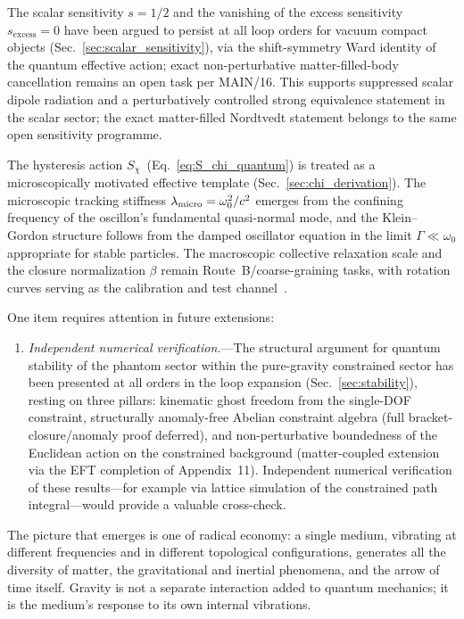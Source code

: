\documentclass[aps,prd,onecolumn,superscriptaddress,nofootinbib,showpacs,12pt,notitlepage]{revtex4-2}
\begin{document}
The scalar sensitivity $s = 1/2$ and the vanishing of the
excess sensitivity $s_{\mathrm{excess}} = 0$ have been
argued to persist at all loop orders for vacuum compact
objects (Sec.~\ref{sec:scalar_sensitivity}), via the
shift-symmetry Ward identity of the quantum effective action;
exact non-perturbative matter-filled-body cancellation remains
an open task per MAIN/16. This supports suppressed scalar
dipole radiation and a perturbatively controlled
strong equivalence statement in the scalar sector; the exact
matter-filled Nordtvedt statement belongs to the same open
sensitivity programme.

The hysteresis action
$S_\chi$~(Eq.~\ref{eq:S_chi_quantum}) is treated as a
microscopically motivated effective template
(Sec.~\ref{sec:chi_derivation}).  The microscopic tracking
stiffness $\lambda_{\rm micro} = \omega_0^2/c^2$ emerges
from the confining frequency of the oscillon's fundamental
quasi-normal mode, and the Klein--Gordon structure follows
from the damped oscillator equation in the limit
$\Gamma \ll \omega_0$ appropriate for stable particles.
The macroscopic collective relaxation scale and the closure
normalization $\beta$ remain Route~B/coarse-graining tasks,
with rotation curves serving as the calibration and test
channel~\cite{Lotishvili2026}.

One item requires attention in future extensions:
\begin{enumerate}
  \item \textit{Independent numerical verification.}---The
    structural argument for quantum stability of the phantom
    sector within the pure-gravity constrained sector has been
    presented at all orders in the loop expansion
    (Sec.~\ref{sec:stability}), resting on three pillars:
    kinematic ghost freedom from the single-DOF constraint,
    structurally anomaly-free Abelian constraint algebra (full
    bracket-closure/anomaly proof deferred), and
    non-perturbative boundedness of the Euclidean action on the
    constrained background (matter-coupled extension via the
    EFT completion of Appendix~11).
    Independent numerical verification of these results---for
    example via lattice simulation of the constrained path
    integral---would provide a valuable cross-check.
\end{enumerate}

The picture that emerges is one of radical economy:
a single medium, vibrating at different frequencies
and in different topological configurations, generates
all the diversity of matter, the gravitational and
inertial phenomena, and the arrow of time itself.  Gravity is
not a separate interaction added to quantum mechanics;
it is the medium's response to its own internal
vibrations.
\end{document}
